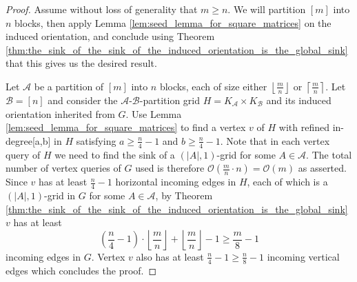 \documentclass[a4paper,10pt]{article}
\newcommand{\indegree}{refined in-degree\xspace}
\newcommand{\A}{\ensuremath{\mathcal A}}
\newcommand{\B}{\ensuremath{\mathcal B}}
\begin{document}
\begin{proof}
 Assume without loss of generality that $m \geq n$. 
 We will partition $[m]$ into $n$ blocks, then apply Lemma \ref{lem:seed_lemma_for_square_matrices} on the induced orientation, and conclude using Theorem \ref{thm:the_sink_of_the_sink_of_the_induced_orientation_is_the_global_sink} that this  gives us the desired result. 
 
  Let $\A$ be a partition of $[m]$ into $n$ blocks, each of size either $\left\lfloor \frac{m}{n} \right\rfloor$ or $\left\lceil \frac{m}{n} \right\rceil$. Let $\B = [n]$ and 
consider the $\A$-$\B$-partition grid $H = K_\A\times K_\B$ and its induced orientation inherited from $G$. 
 Use Lemma \ref{lem:seed_lemma_for_square_matrices} to find a vertex $v$ of $H$ with \indegree [a,b] in $H$ satisfying $a \geq \frac{n}{4} - 1$ and $b \geq \frac{n}{4} - 1$. 
 Note that in each vertex query of $H$ we need to find the sink of a $(|A|,1)$-grid for some $A\in \A$. 
 The total number of vertex queries of $G$ used is therefore $\mathcal{O}(\frac{m}{n}\cdot n) = \mathcal{O}(m)$ as asserted. 
 Since $v$ has at least $\frac{n}{4} - 1$ horizontal incoming edges in $H$, each of which is a $(|A|,1)$-grid in $G$ for some $A\in \A$, 
 by Theorem \ref{thm:the_sink_of_the_sink_of_the_induced_orientation_is_the_global_sink} $v$ has at least $$\left(\frac{n}{4} - 1\right)\cdot\left\lfloor \frac{m}{n} \right\rfloor + \left\lfloor \frac{m}{n} \right\rfloor - 1 \geq \frac{m}{8} - 1$$ incoming edges in $G$. 
 Vertex $v$ also has at least $\frac{n}{4} - 1 \geq \frac{n}{8} - 1$ incoming vertical edges which concludes the proof. 
\end{proof}


\end{document}
